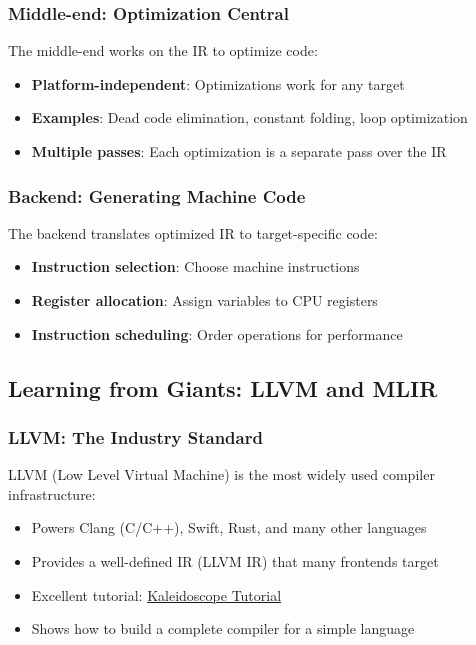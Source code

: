 \documentclass[11pt,a4paper]{article}
\begin{document}
\subsubsection{Middle-end: Optimization Central}

The middle-end works on the IR to optimize code:
\begin{itemize}
    \item \textbf{Platform-independent}: Optimizations work for any target
    \item \textbf{Examples}: Dead code elimination, constant folding, loop optimization
    \item \textbf{Multiple passes}: Each optimization is a separate pass over the IR
\end{itemize}

\subsubsection{Backend: Generating Machine Code}

The backend translates optimized IR to target-specific code:
\begin{itemize}
    \item \textbf{Instruction selection}: Choose machine instructions
    \item \textbf{Register allocation}: Assign variables to CPU registers
    \item \textbf{Instruction scheduling}: Order operations for performance
\end{itemize}

\subsection{Learning from Giants: LLVM and MLIR}

\subsubsection{LLVM: The Industry Standard}

LLVM (Low Level Virtual Machine) is the most widely used compiler infrastructure:
\begin{itemize}
    \item Powers Clang (C/C++), Swift, Rust, and many other languages
    \item Provides a well-defined IR (LLVM IR) that many frontends target
    \item Excellent tutorial: \href{https://llvm.org/docs/tutorial/MyFirstLanguageFrontend/index.html}{Kaleidoscope Tutorial}
    \item Shows how to build a complete compiler for a simple language
\end{itemize}
\end{document}
